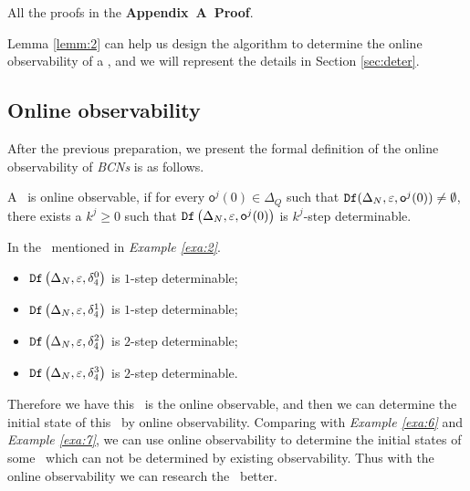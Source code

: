 All the proofs in the {\bf Appendix~A~Proof}. 

Lemma \ref{lemm:2} can help us design the algorithm to determine the online observability of a \BCN, and we will represent the details in   Section \ref{sec:deter}.

\subsection{Online observability}
After the previous preparation, we present the formal definition of the online observability of {\em BCNs} is as follows.

\begin{definition}
 A \BCN\ is online observable,
if for every $\mathsf{o}^{j}(0)\in \Delta_Q$ such that ${\tt Df}(\Delta_N,\varepsilon, \mathsf{o}^{j}(0))\ne \emptyset$, there exists a $k^{j}\ge0$ such that ${\tt Df}\left(\Delta_N,\varepsilon,\mathsf{o}^{j}(0)\right)$ is $k^{j}$-step determinable.
\end{definition}


\begin{example}
In the \BCN\ mentioned in {\em Example \ref{exa:2}}.  
 \begin{itemize}
 \item ${\tt Df}\left(\Delta_N,\varepsilon, \delta_{4}^0\right)$ is $1$-step determinable;
 \item ${\tt Df}\left(\Delta_N,\varepsilon, \delta_{4}^1\right)$ is $1$-step determinable;
 \item ${\tt Df}\left(\Delta_N,\varepsilon, \delta_{4}^2\right)$ is $2$-step determinable;
 \item ${\tt Df}\left(\Delta_N,\varepsilon, \delta_{4}^3\right)$ is $2$-step determinable.
 \end{itemize}
 
Therefore we have this \BCN\ is the online observable, and then we can determine the initial state of this \BCN\ by online observability. Comparing with {\em Example \ref{exa:6}} and {\em Example \ref{exa:7}}, we can use online observability to determine the initial states of some \BCNs\ which can not be determined by existing observability. Thus with the online observability we can research the \BCNs\ better.
\label{exa:10}
\end{example}  

